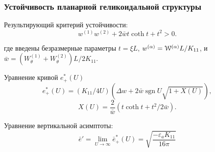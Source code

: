 \documentclass[utf8,secheader]{beamer}
\DeclareMathOperator{\sgn}{sgn}
\newcommand{\FF}{\mathcal{F}}
\begin{document}
\begin{frame}
\frametitle{Устойчивость планарной геликоидальной структуры}
\begin{block}{Результирующий критерий устойчивости:}
\begin{equation}\label{stab_cond_final}
w^{(1)}w^{(2)}+2\bar{w}   t \coth t+ t^2>0.
\end{equation}
\end{block}
где введены безразмерные параметры $t = \xi L$,  $w^{(\alpha)}={\EuScript{W}^{(\alpha)} L}/{K_{11}}$, и $\bar{w}=({W}^{(1)}_\theta+{W}^{(2)}_\theta)L/2K_{11}$.
\begin{block}{Уравнение кривой $e^*_+(U)$}
	\begin{equation}\label{eq:!!}
		e_{+}^*(U)=\left(K_{11}/4U\right)\left(\Delta{w}+ 2\bar{w}\sgn{U}\sqrt{ 1+X(U) }\right) ,
	\end{equation}
	\begin{equation}\label{eq:e(U)_ea<0}
		X(U)=\frac{2}{\bar{w}} \left( t\coth t +{t^2}/2\bar{w} \right).
	\end{equation}
\end{block}
Уравнение вертикальной асимптоты:
\begin{equation}
\bar{e}' = \lim_{U\to \infty} \bar{e}^*_+(U) = \sqrt{\frac{-\varepsilon_a K_{11}}{16\pi}}
\end{equation}
\end{frame}



%
\end{document}
